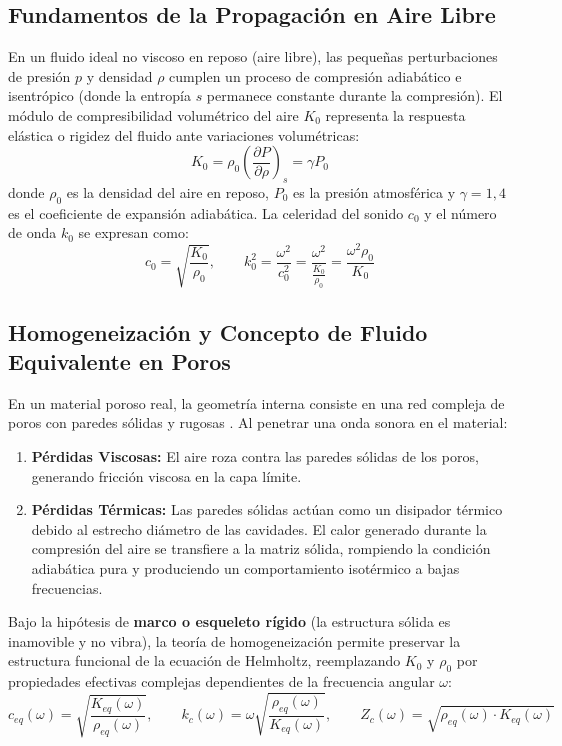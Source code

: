 \documentclass[11pt,a4paper]{article}
\begin{document}
\subsection{Fundamentos de la Propagación en Aire Libre}
En un fluido ideal no viscoso en reposo (aire libre), las pequeñas perturbaciones de presión $p$ y densidad $\rho$ cumplen un proceso de compresión adiabático e isentrópico (donde la entropía $s$ permanece constante durante la compresión). El módulo de compresibilidad volumétrico del aire $K_0$ representa la respuesta elástica o rigidez del fluido ante variaciones volumétricas:
\begin{equation}
K_0 = \rho_0 \left( \frac{\partial P}{\partial \rho} \right)_s = \gamma P_0
\end{equation}
donde $\rho_0$ es la densidad del aire en reposo, $P_0$ es la presión atmosférica y $\gamma = 1{,}4$ es el coeficiente de expansión adiabática. La celeridad del sonido $c_0$ y el número de onda $k_0$ se expresan como:
\begin{equation}
c_0 = \sqrt{\frac{K_0}{\rho_0}}, \qquad k_0^2 = \frac{\omega^2}{c_0^2} = \frac{\omega^2}{\frac{K_0}{\rho_0}} = \frac{\omega^2 \rho_0}{K_0}
\end{equation}

\subsection{Homogeneización y Concepto de Fluido Equivalente en Poros}
En un material poroso real, la geometría interna consiste en una red compleja de poros con paredes sólidas y rugosas \citep{venegas2011}. Al penetrar una onda sonora en el material:
\begin{enumerate}[label=\arabic*.]
    \item \textbf{Pérdidas Viscosas:} El aire roza contra las paredes sólidas de los poros, generando fricción viscosa en la capa límite.
    \item \textbf{Pérdidas Térmicas:} Las paredes sólidas actúan como un disipador térmico debido al estrecho diámetro de las cavidades. El calor generado durante la compresión del aire se transfiere a la matriz sólida, rompiendo la condición adiabática pura y produciendo un comportamiento isotérmico a bajas frecuencias.
\end{enumerate}

Bajo la hipótesis de \textbf{marco o esqueleto rígido} (la estructura sólida es inamovible y no vibra), la teoría de homogeneización permite preservar la estructura funcional de la ecuación de Helmholtz, reemplazando $K_0$ y $\rho_0$ por propiedades efectivas complejas dependientes de la frecuencia angular $\omega$:
\begin{equation}
c_{eq}(\omega) = \sqrt{\frac{K_{eq}(\omega)}{\rho_{eq}(\omega)}}, \qquad k_c(\omega) = \omega \sqrt{\frac{\rho_{eq}(\omega)}{K_{eq}(\omega)}}, \qquad Z_c(\omega) = \sqrt{\rho_{eq}(\omega) \cdot K_{eq}(\omega)}
\end{equation}
\end{document}
